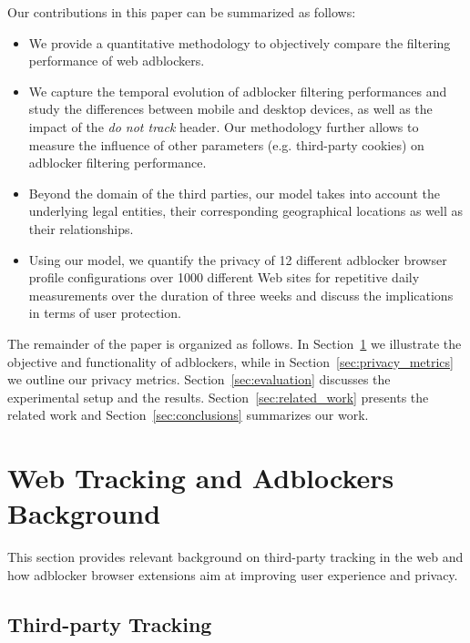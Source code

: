 \documentclass[compsoc, conference, letterpaper, 10pt, times]{IEEEtran}
\begin{document}
Our contributions in this paper can be summarized as follows:
 \begin{itemize}
 \item We provide a quantitative methodology to objectively compare the filtering performance of web adblockers.
 \item We capture the temporal evolution of adblocker filtering performances and study the differences between mobile and desktop devices, as well as the impact of the \emph{do not track} header. Our methodology further allows to measure the influence of other parameters (e.g. third-party cookies) on adblocker filtering performance.
 \item Beyond the domain of the third parties, our model takes into account the underlying legal entities, their corresponding geographical locations as well as their relationships.
 \item Using our model, we quantify the privacy of 12 different adblocker browser profile configurations over 1000 different Web sites for repetitive daily measurements over the duration of three weeks and discuss the implications in terms of user protection.
\end{itemize}

The remainder of the paper is organized as follows. In Section~\ref{sec:background} we illustrate the objective and functionality of adblockers, while in Section~\ref{sec:privacy_metrics} we outline our privacy metrics. Section~\ref{sec:evaluation} discusses the experimental setup and the results. Section~\ref{sec:related_work} presents the related work and Section~\ref{sec:conclusions} summarizes our work.

\section{Web Tracking and Adblockers Background}
\label{sec:background}
This section provides relevant background on third-party tracking  in the web and how adblocker browser extensions aim at improving user experience and privacy.

\subsection{Third-party Tracking}
\end{document}

